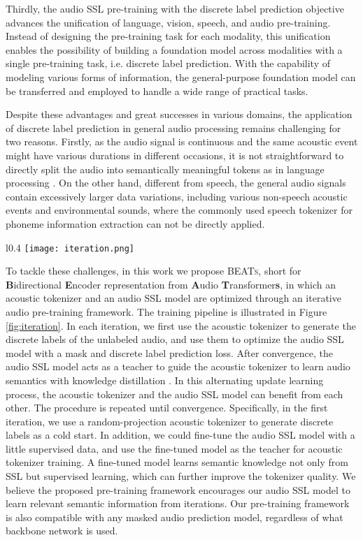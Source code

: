 \documentclass{article}
\theoremstyle{plain}
\theoremstyle{definition}
\theoremstyle{remark}
\newcommand\our{\textsc{BEATs}}
\begin{document}
Thirdly, the audio SSL pre-training with the discrete label prediction objective advances the unification of language, vision, speech, and audio pre-training.
Instead of designing the pre-training task for each modality, this unification enables the possibility of building a foundation model across modalities with a single pre-training task, i.e. discrete label prediction.
With the capability of modeling various forms of information, the general-purpose foundation model can be transferred and employed to handle a wide range of practical tasks.

Despite these advantages and great successes in various domains, the application of discrete label prediction in general audio processing remains challenging for two reasons. Firstly, as the audio signal is continuous and the same acoustic event might have various durations in different occasions, it is not straightforward to directly split the audio into semantically meaningful tokens as in language processing \citep{devlin2019bert}. 
On the other hand, different from speech, the general audio signals contain excessively larger data variations, including various non-speech acoustic events and environmental sounds, where the commonly used speech tokenizer for phoneme information extraction \citep{hsu2021hubert} can not be directly applied.

\begin{wrapfigure}{l}{0.4\textwidth}
\texttt{[image: iteration.png]} 
\caption{Iterative audio pre-training of \our{}.}
\label{fig:iteration}
\end{wrapfigure}

To tackle these challenges, in this work we propose \our{}, short for  \textbf{B}idirectional \textbf{E}ncoder representation from \textbf{A}udio \textbf{T}ransformer\textbf{s},
in which an acoustic tokenizer and an audio SSL model are optimized through an iterative audio pre-training framework.
The training pipeline is illustrated in Figure \ref{fig:iteration}.
In each iteration, we first use the acoustic tokenizer to generate the discrete labels of the unlabeled audio, and use them to optimize the audio SSL model with a mask and discrete label prediction loss.
After convergence, the audio SSL model acts as a teacher to guide the acoustic tokenizer to learn audio semantics with knowledge distillation \citep{hinton2015distilling}.
In this alternating update learning process, the acoustic tokenizer and the audio SSL model can benefit from each other. The procedure is repeated until convergence.  
Specifically, in the first iteration, we use a random-projection acoustic tokenizer to generate discrete labels as a cold start. 
In addition, we could fine-tune the audio SSL model with a little supervised data, and use the fine-tuned model as the teacher for acoustic tokenizer training. A fine-tuned model learns semantic knowledge not only from SSL but supervised learning, which can further improve the  tokenizer quality. 
We believe the proposed pre-training framework encourages our audio SSL model to learn relevant semantic information from iterations. 
Our pre-training framework is also compatible with any masked audio prediction model, regardless of what backbone network is used. 
\end{document}
